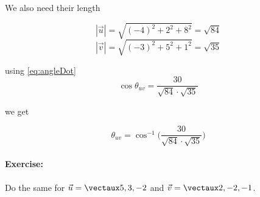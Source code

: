 \documentclass{article}
\begin{document}
We also need their length

\[
|\vec{u}| = \sqrt{(-4)^2+2^2+8^2} = \sqrt{84} 
\]
\[
|\vec{v}| = \sqrt{(-3)^2+5^2+1^2} = \sqrt{35} 
\]

using \eqref{eq:angleDot}
\[
\cos \theta_{uv} = \frac{30}{\sqrt{84}\cdot\sqrt{35}}
\]

we get 

\[
\theta_{uv} = \cos^{-1} \bigg( \frac{30}{\sqrt{84}\cdot\sqrt{35}}\bigg)
\]



\paragraph{Exercise:} Do the same for $\vec{u}=\vect{5,3,-2}$ and $\vec{v}=\vect{2,-2,-1}$.
\end{document}
